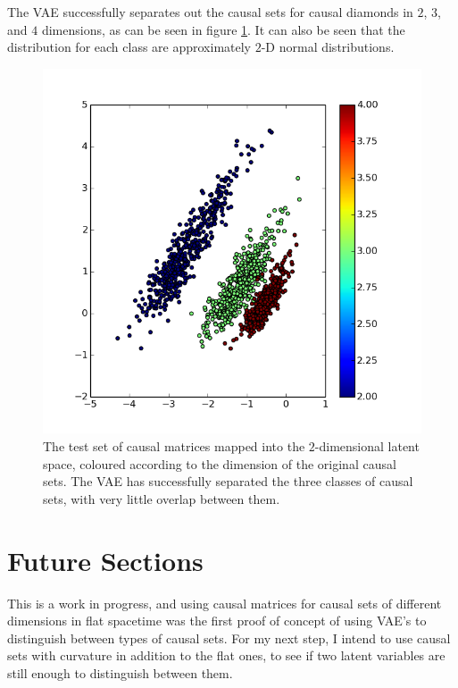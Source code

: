 \documentclass[letterpaper,10pt]{article}
\begin{document}
The VAE successfully separates out the causal sets for causal diamonds in $2$, $3$, and $4$ dimensions, as can be seen in figure \ref{resultsfig}.  
It can also be seen that the distribution for each class are approximately $2$-D normal distributions.

\begin{figure} [ht]
\begin{center}
  \includegraphics[width=5in]{latent_encoding.png}
\end{center}
  \caption{
The test set of causal matrices mapped into the $2$-dimensional latent space, coloured according to the dimension of the original causal sets.  
The VAE has successfully separated the three classes of causal sets, with very little overlap between them.} \label{resultsfig}
\end{figure}

\section{Future Sections} \label{future}

This is a work in progress, and using causal matrices for causal sets of different dimensions in flat spacetime was the first proof of concept of using 
VAE's to distinguish between types of causal sets.  For my next step, I intend to use causal sets with curvature in addition to the flat ones, to see if 
two latent variables are still enough to distinguish between them.  
\end{document}
